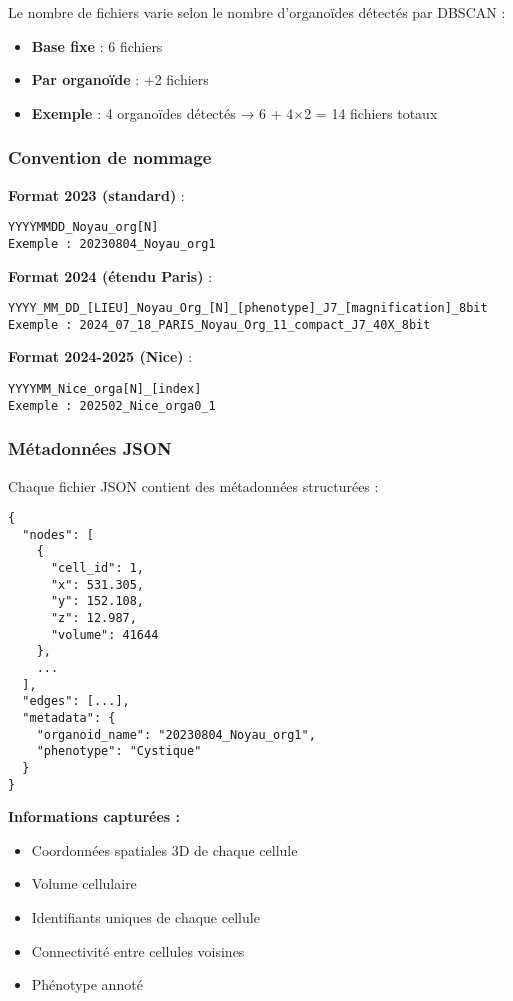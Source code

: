 Le nombre de fichiers varie selon le nombre d'organoïdes détectés par DBSCAN :
\begin{itemize}
    \item \textbf{Base fixe} : 6 fichiers
    \item \textbf{Par organoïde} : +2 fichiers
    \item \textbf{Exemple} : 4 organoïdes détectés → 6 + 4×2 = 14 fichiers totaux
\end{itemize}

\subsubsection{Convention de nommage}

\textbf{Format 2023 (standard)} :
\begin{verbatim}
YYYYMMDD_Noyau_org[N]
Exemple : 20230804_Noyau_org1
\end{verbatim}

\textbf{Format 2024 (étendu Paris)} :
\begin{verbatim}
YYYY_MM_DD_[LIEU]_Noyau_Org_[N]_[phenotype]_J7_[magnification]_8bit
Exemple : 2024_07_18_PARIS_Noyau_Org_11_compact_J7_40X_8bit
\end{verbatim}

\textbf{Format 2024-2025 (Nice)} :
\begin{verbatim}
YYYYMM_Nice_orga[N]_[index]
Exemple : 202502_Nice_orga0_1
\end{verbatim}

\subsubsection{Métadonnées JSON}

Chaque fichier JSON contient des métadonnées structurées :

\begin{verbatim}
{
  "nodes": [
    {
      "cell_id": 1,
      "x": 531.305,
      "y": 152.108,
      "z": 12.987,
      "volume": 41644
    },
    ...
  ],
  "edges": [...],
  "metadata": {
    "organoid_name": "20230804_Noyau_org1",
    "phenotype": "Cystique"
  }
}
\end{verbatim}

\textbf{Informations capturées :}
\begin{itemize}
    \item Coordonnées spatiales 3D de chaque cellule
    \item Volume cellulaire
    \item Identifiants uniques de chaque cellule
    \item Connectivité entre cellules voisines
    \item Phénotype annoté
\end{itemize}

